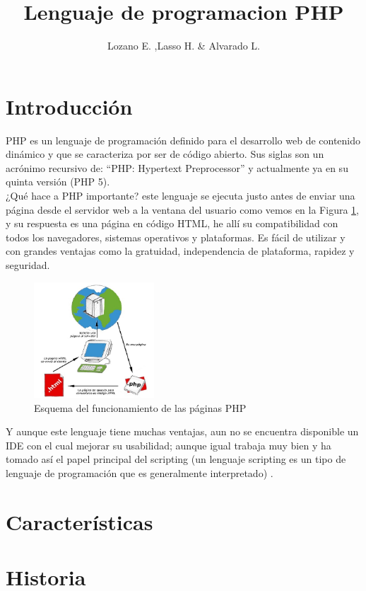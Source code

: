\documentclass[11pt]{article} %
\title{Lenguaje de programacion PHP}
\author{Lozano E. ,Lasso H. \& Alvarado L.}
\begin{document}
\maketitle

\section{Introducción}
PHP es un lenguaje de programación definido para el desarrollo web de contenido dinámico y que se caracteriza por ser de código abierto. Sus siglas son un acrónimo recursivo de: “PHP: Hypertext Preprocessor” y actualmente ya en su quinta versión (PHP 5).
\\¿Qué hace a PHP importante? este lenguaje se ejecuta justo antes de enviar una página desde el servidor web a la ventana del usuario como vemos en la Figura \ref{fig:funcionamiento}, y su respuesta es una página en código HTML, he allí su compatibilidad con todos los navegadores, sistemas operativos y plataformas.  Es fácil de utilizar y con grandes ventajas como la gratuidad, independencia de plataforma, rapidez y seguridad. 

\begin{figure}[H]
  \centering
    \includegraphics[width=0.4\textwidth]{Imagenes/diagrama-php}
  \caption{Esquema del funcionamiento de las páginas PHP}
  \label{fig:funcionamiento}
\end{figure}
 Y aunque este lenguaje tiene muchas ventajas, aun no se encuentra disponible un IDE con el cual mejorar su usabilidad; aunque igual trabaja muy bien y ha tomado así el papel principal del scripting (un lenguaje scripting es un tipo de lenguaje de programación que es generalmente interpretado) \cite{[1]}.

\section{Características}



\section{Historia}
\end{document}
